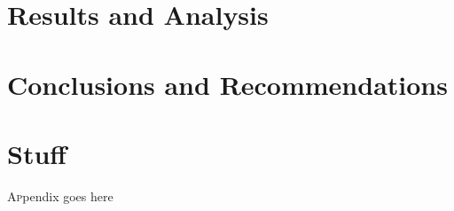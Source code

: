 \documentclass[]{afit-etd}
\begin{document}
\chapter{Results and Analysis}


\chapter{Conclusions and Recommendations}


%
%
\appendix    %

\chapter{Stuff}
\lettrine{A}ppendix goes here


\end{document}
